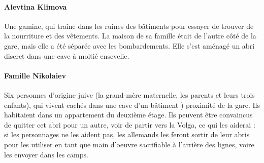 \documentclass{report}
\begin{document}
\begin{multicols}{2}
\paragraph{Alevtina Klimova}Une gamine, qui traîne dans les ruines des bâtiments pour essayer de trouver de la nourriture et des vêtements. La maison de sa famille était de l'autre côté de la gare, mais elle a été séparée avec les bombardements. Elle s'est aménagé un abri discret dans une cave à moitié ensevelie.
\paragraph{Famille Nikolaiev} Six personnes d'origine juive (la grand-mère maternelle, les parents et leurs trois enfants), qui vivent cachés dans une cave d'un bâtiment ) proximité de la gare. Ils habitaient dans un appartement du deuxième étage. Ils peuvent être convaincus de quitter cet abri pour un autre, voir de partir vers la Volga, ce qui les aiderai : si les personnages ne les aident pas, les allemands les feront sortir de leur abris pour les utiliser en tant que main d'oeuvre sacrifiable à l'arrière des lignes, voire les envoyer dans les camps.
\end{multicols}
\end{document}
